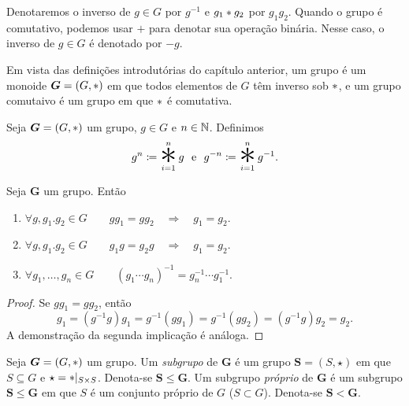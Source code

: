 \begin{nota}
	Denotaremos o inverso de $g \in G$ por $g^{-1}$ e $g_1 \ast g_2$ por $g_1g_2$. Quando o grupo é comutativo, podemos usar $+$ para denotar sua operação binária. Nesse caso, o inverso de $g \in G$ é denotado por $-g$.
\end{nota}

Em vista das definições introdutórias do capítulo anterior, um grupo é um monoide $\bm G=(G,\ast)$ em que todos elementos de $G$ têm inverso sob $\ast$, e um grupo comutaivo é um grupo em que $\ast$ é comutativa.

\begin{defi}
Seja $\bm G=(G,\ast)$ um grupo, $g \in G$ e $n \in \mathbb{N}$. Definimos
	\begin{equation*}
	g^n \coloneqq \bigopb_{i=1}^n g \e g^{-n} \coloneqq \bigopb_{i=1}^n g^{-1}.
	\end{equation*}
\end{defi}

\begin{prop}
	Seja $\bm G$ um grupo. Então
	\begin{enumerate}
	\item $\forall g,g_1.g_2 \in G \qquad gg_1 = gg_2 \quad \Rightarrow \quad g_1 = g_2$.
	\item $\forall g,g_1.g_2 \in G \qquad g_1g = g_2g \quad \Rightarrow \quad g_1 = g_2$.
	\item $\forall g_1,\ldots,g_n \in G \qquad (g_1 \cdots g_n)^{-1}=g_n^{-1} \cdots g_1^{-1}.$
	\end{enumerate}
\end{prop}
\begin{proof}
	Se $g g_1 = g g_2$, então
	\begin{equation*}
	g_1 = (g^{-1}g)g_1 = g^{-1}(gg_1) = g^{-1}(gg_2) = (g^{-1}g)g_2 = g_2.
	\end{equation*}
A demonstração da segunda implicação é análoga.
\end{proof}

\begin{defi}
Seja $\bm G=(G,\ast)$ um grupo. Um \emph{subgrupo} de $\bm G$ é um grupo $\bm S=(S,\star)$ em que $S \subseteq G$ e $\star=\ast|_{S \times S}$. Denota-se $\bm S \leq \bm G$. Um subgrupo \emph{próprio} de $\bm G$ é um subgrupo $\bm S \leq \bm G$ em que $S$ é um conjunto próprio de $G$ ($S  \subset G$). Denota-se $\bm S < \bm G$.
\end{defi}

